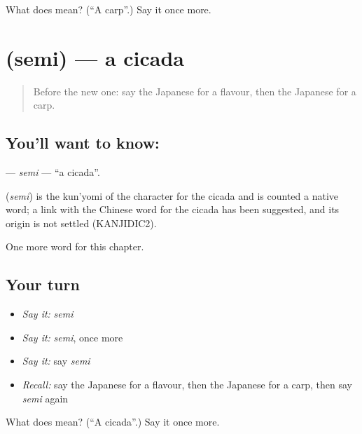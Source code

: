 \begin{tcolorbox}[breakable,colback=teal!4,colframe=teal!35!black,title={Before you move on}]
What does  mean? (\textquotedblleft{}A carp\textquotedblright{}.) Say it once more.
\end{tcolorbox}
\section[\texorpdfstring{\ja{せみ} (semi)}{せみ (semi)}]{ (semi) — a cicada}

\label{lesson:JA-C65-semi}



\begin{quote}
Before the new one: say the Japanese for a flavour, then the Japanese for a carp.
\end{quote}

\subsection*{You'll want to know: }
\textbf{} — \emph{semi} — \textquotedblleft{}a cicada\textquotedblright{}.

\begin{cousinweb}
\textbf{} (\emph{semi}) is the kun'yomi of the character for the cicada and is counted a native word; a link with the Chinese word for the cicada has been suggested, and its origin is not settled (KANJIDIC2).
\end{cousinweb}

\begin{grammarlens}[title={What you've built}]
One more word for this chapter.
\end{grammarlens}

\subsection*{Your turn}
\begin{itemize}
\raggedright
  \item \emph{Say it:} \emph{semi}
  \item \emph{Say it:} \emph{semi}, once more
  \item \emph{Say it:} say \emph{semi}
  \item \emph{Recall:} say the Japanese for a flavour, then the Japanese for a carp, then say \emph{semi} again
\end{itemize}

\begin{tcolorbox}[breakable,colback=teal!4,colframe=teal!35!black,title={Before you move on}]
What does  mean? (\textquotedblleft{}A cicada\textquotedblright{}.) Say it once more.
\end{tcolorbox}
